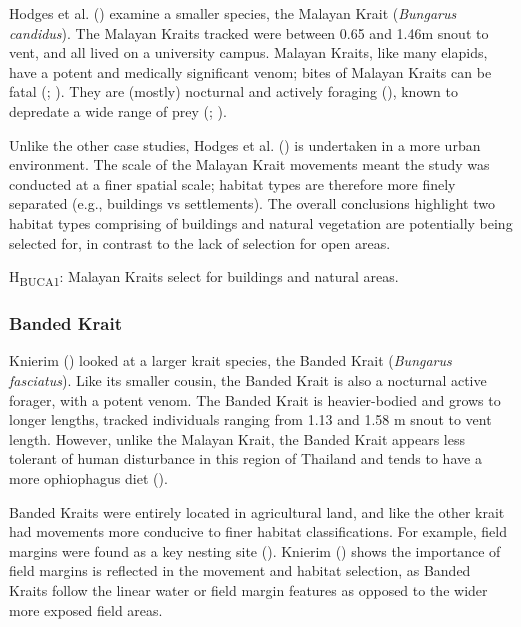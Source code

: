 \documentclass[10pt,a4paper]{article}
\begin{document}
Hodges et al. () examine a smaller species, the Malayan Krait (\emph{Bungarus candidus}).
The Malayan Kraits tracked were between 0.65 and 1.46m snout to vent, and all lived on a university campus.
Malayan Kraits, like many elapids, have a potent and medically significant venom; bites of Malayan Kraits can be fatal (; ).
They are (mostly) nocturnal and actively foraging (), known to depredate a wide range of prey (; ).

Unlike the other case studies, Hodges et al. () is undertaken in a more urban environment.
The scale of the Malayan Krait movements meant the study was conducted at a finer spatial scale; habitat types are therefore more finely separated (e.g., buildings vs settlements).
The overall conclusions highlight two habitat types comprising of buildings and natural vegetation are potentially being selected for, in contrast to the lack of selection for open areas.

H\textsubscript{BUCA1}: Malayan Kraits select for buildings and natural areas.

\subsubsection{Banded Krait}\label{banded-krait}

Knierim () looked at a larger krait species, the Banded Krait (\emph{Bungarus fasciatus}).
Like its smaller cousin, the Banded Krait is also a nocturnal active forager, with a potent venom.
The Banded Krait is heavier-bodied and grows to longer lengths, tracked individuals ranging from 1.13 and 1.58 m snout to vent length.
However, unlike the Malayan Krait, the Banded Krait appears less tolerant of human disturbance in this region of Thailand and tends to have a more ophiophagus diet ().

Banded Kraits were entirely located in agricultural land, and like the other krait had movements more conducive to finer habitat classifications.
For example, field margins were found as a key nesting site ().
Knierim () shows the importance of field margins is reflected in the movement and habitat selection, as Banded Kraits follow the linear water or field margin features as opposed to the wider more exposed field areas.
\end{document}
